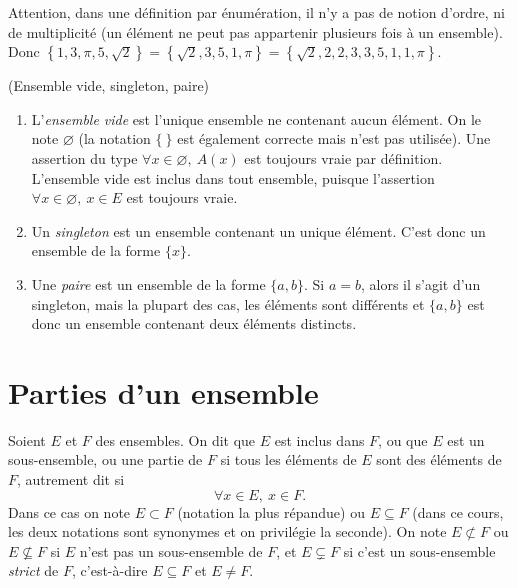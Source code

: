 Attention, dans une définition par énumération, il n'y a pas de notion d'ordre, ni de multiplicité (un élément ne peut pas appartenir \og plusieurs fois\fg{} à un ensemble). Donc  $\left\{1,3,\pi,5,\sqrt2\right\} = \left\{\sqrt 2, 3,5,1,\pi\right\}=\left\{\sqrt 2,2, 2, 3,  3,5,1,1,\pi\right\}$.


\begin{definition}(Ensemble vide, singleton, paire)
\begin{enumerate}
\item L'\emph{ensemble vide} est l'unique ensemble ne contenant aucun élément. On le note $\varnothing$ (la notation $\{\:\}$ est également correcte mais n'est pas utilisée). Une assertion du type \og $\forall x\in \varnothing, \: A(x)$\fg{} est toujours vraie par définition. L'ensemble vide est inclus dans tout ensemble, puisque l'assertion \og $\forall x\in \varnothing, \: x\in E$\fg{} est toujours vraie.
\item Un \emph{singleton} est un ensemble contenant un unique élément. C'est donc un ensemble de la forme $\{x\}$.
\item Une \emph{paire} est un ensemble de la forme $\{a,b\}$. Si $a=b$, alors il s'agit d'un singleton, mais la plupart des cas, les éléments sont différents et $\{a,b\}$ est donc un ensemble contenant deux éléments distincts.
\end{enumerate}
\end{definition}

\section{Parties d'un ensemble}

\begin{definition}
Soient $E$ et $F$ des ensembles. On dit que $E$ est inclus dans $F$, ou que $E$ est un sous-ensemble, ou une partie de $F$ si tous les éléments de $E$ sont des éléments de $F$, autrement dit si 
\[
\forall x\in E, \: x\in F.
\]
Dans ce cas on note $E\subset F$ (notation la plus répandue) ou $E\subseteq F$ (dans ce cours, les deux notations sont synonymes et on privilégie la seconde). On note $E\not\subset F$ ou $E\nsubseteq F$ si $E$ n'est pas un sous-ensemble de $F$, et $E\subsetneq F$  si c'est un sous-ensemble \emph{strict} de $F$, c'est-à-dire $E\subseteq F$ et $E\neq F$.
\end{definition}

